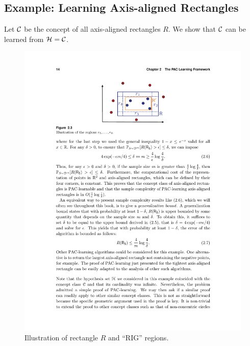 \subsection{Example: Learning Axis-aligned Rectangles}
Let $\mathcal{C}$ be the concept of all axis-aligned rectangles $R$. We show that $\mathcal{C}$ can be learned from $\mathcal{H} = \mathcal{C}$. 
\begin{figure}[h]
\center
	\includegraphics[width=0.5\linewidth]{figures/PAC_rect}
	\caption{Illustration of rectangle $R$ and ``RIG'' regions. \label{fig:pca}}
\end{figure}

